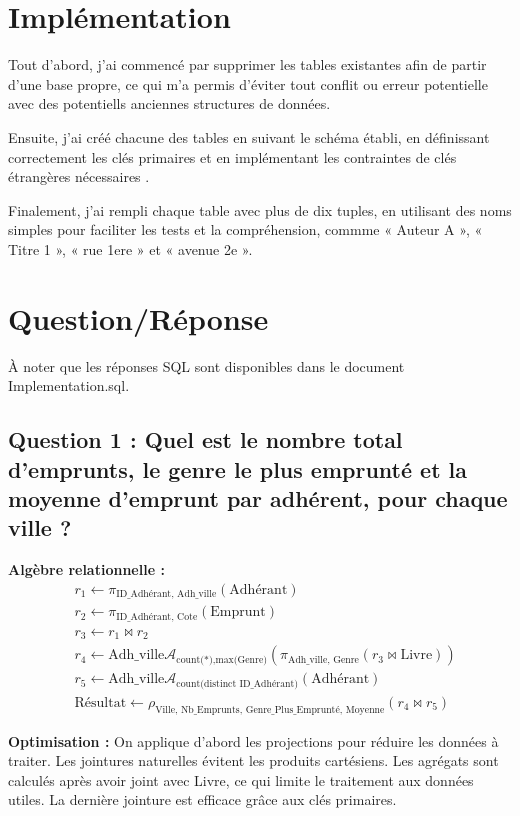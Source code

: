 \documentclass[12pt]{article}
\begin{document}
\section*{Implémentation}
Tout d’abord, j’ai commencé par supprimer les tables existantes afin de partir d’une base propre, ce qui m’a permis
d’éviter tout conflit ou erreur potentielle avec des potentiells anciennes structures de données.

Ensuite, j’ai créé chacune des tables en suivant le schéma établi, en définissant correctement les clés primaires et en
implémentant les contraintes de clés étrangères nécessaires .

Finalement, j’ai rempli chaque table avec plus de dix tuples, en utilisant des noms simples pour faciliter les tests et
la compréhension, commme « Auteur A », « Titre 1 »,  « rue 1ere » et « avenue 2e ».


\section*{Question/Réponse}
À noter que les réponses SQL sont disponibles dans le document Implementation.sql.

\subsection*{Question 1 : Quel est le nombre total d’emprunts, le genre le plus emprunté et la moyenne d'emprunt par
adhérent, pour chaque ville ?}

\textbf{Algèbre relationnelle :}
\[
\begin{aligned}
  &r_1 \leftarrow \pi_{\text{ID\_Adhérant, Adh\_ville}}(\text{Adhérant}) \\
  &r_2 \leftarrow \pi_{\text{ID\_Adhérant, Cote}}(\text{Emprunt}) \\
  &r_3 \leftarrow r_1 \bowtie r_2 \\
  &r_4 \leftarrow \text{Adh\_ville} \mathcal{A}_{\text{count(*)}, \text{max(Genre)}} (\pi_{\text{Adh\_ville, Genre}}(r_3 \bowtie \text{Livre})) \\
  &r_5 \leftarrow \text{Adh\_ville} \mathcal{A}_{\text{count(distinct ID\_Adhérant)}}(\text{Adhérant}) \\
  &\text{Résultat} \leftarrow \rho_{\text{Ville, Nb\_Emprunts, Genre\_Plus\_Emprunté, Moyenne}}(r_4 \bowtie r_5)
\end{aligned}
\]

\textbf{Optimisation :}  
On applique d’abord les projections pour réduire les données à traiter. Les jointures naturelles évitent les produits
cartésiens. Les agrégats sont calculés après avoir joint avec Livre, ce qui limite le traitement aux données utiles.
La dernière jointure est efficace grâce aux clés primaires.
\end{document}
